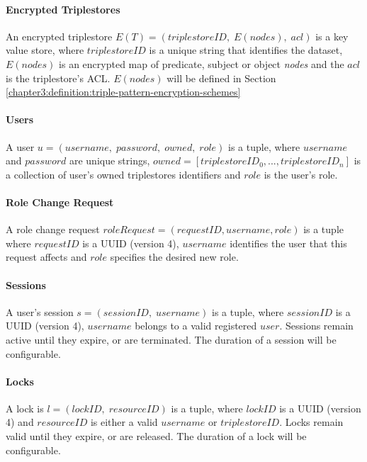 \paragraph*{Encrypted Triplestores} An encrypted triplestore $E(T) = (triplestoreID,\; E(nodes), \; acl)$ is a key value store, where $triplestoreID$ is a unique string that identifies the dataset, $E(nodes)$ is an encrypted map of predicate, subject or object \emph{nodes} and the $acl$ is the triplestore's \gls{ACL}. $E(nodes)$ will be defined in Section \ref{chapter3:definition:triple-pattern-encryption-schemes}

\paragraph*{Users} A user $u = (username, \; password, \; owned, \; role)$ is a tuple, where $username$ and $password$ are unique strings, $owned = [triplestoreID_0,...,triplestoreID_n]$ is a collection of user's owned triplestores identifiers and $role$ is the user's role.

\paragraph*{Role Change Request} A role change request $roleRequest = (requestID, username, role)$ is a tuple where $requestID$ is a \gls{UUID} (version 4), $username$ identifies the user that this request affects and $role$ specifies the desired new role.

\paragraph*{Sessions} A user's session $s = (sessionID,\; username)$ is a tuple, where  $sessionID$ is a \gls{UUID} (version 4), $username$ belongs to a valid registered $user$. Sessions remain active until they expire, or are terminated. The duration of a session will be configurable.

\paragraph*{Locks} A lock is $l = (lockID,\; resourceID)$ is a tuple, where  $lockID$ is a \gls{UUID} (version 4) and $resourceID$ is either a valid $username$ or $triplestoreID$. Locks remain valid until they expire, or are released. The duration of a lock will be configurable.

